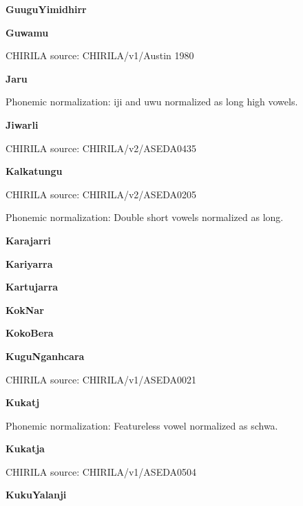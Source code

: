 
\textbf{GuuguYimidhirr}


\textbf{Guwamu}

CHIRILA source: CHIRILA/v1/Austin 1980


\textbf{Jaru}


Phonemic normalization: iji and uwu normalized as long high vowels.

\textbf{Jiwarli}

CHIRILA source: CHIRILA/v2/ASEDA0435


\textbf{Kalkatungu}

CHIRILA source: CHIRILA/v2/ASEDA0205


Phonemic normalization: Double short vowels normalized as long.

\textbf{Karajarri}


\textbf{Kariyarra}


\textbf{Kartujarra}


\textbf{KokNar}


\textbf{KokoBera}


\textbf{KuguNganhcara}

CHIRILA source: CHIRILA/v1/ASEDA0021


\textbf{Kukatj}


Phonemic normalization: Featureless vowel normalized as schwa.

\textbf{Kukatja}

CHIRILA source: CHIRILA/v1/ASEDA0504


\textbf{KukuYalanji}


